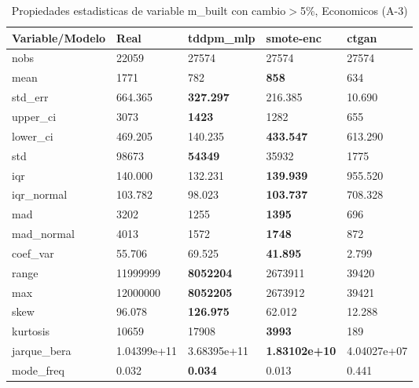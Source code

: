 \begin{table}[H]
\centering
\fontsize{8}{14}\selectfont
\caption{Propiedades estadisticas de variable m\_built con cambio\ensuremath{>}5\%, Economicos (A-3)}
\label{table-stats-economicos-a-3-m_built-short}
\begin{tabular}{|l|m{10em}|m{10em}|m{10em}|m{10em}|}
\hline
 \rowcolor[gray]{0.8}
Variable/Modelo & Real & tddpm\_mlp & smote-enc & ctgan \\
\hline nobs & 22059 & 27574 & 27574 & 27574 \\
\hline mean & 1771 & 782 & \bfseries 858 & \cellcolor[rgb]{0.9, 0.54, 0.52} 634 \\
\hline std\_err & 664.365 & \bfseries 327.297 & 216.385 & \cellcolor[rgb]{0.9, 0.54, 0.52} 10.690 \\
\hline upper\_ci & 3073 & \bfseries 1423 & 1282 & \cellcolor[rgb]{0.9, 0.54, 0.52} 655 \\
\hline lower\_ci & 469.205 & \cellcolor[rgb]{0.9, 0.54, 0.52} 140.235 & \bfseries 433.547 & 613.290 \\
\hline std & 98673 & \bfseries 54349 & 35932 & \cellcolor[rgb]{0.9, 0.54, 0.52} 1775 \\
\hline iqr & 140.000 & 132.231 & \bfseries 139.939 & \cellcolor[rgb]{0.9, 0.54, 0.52} 955.520 \\
\hline iqr\_normal & 103.782 & 98.023 & \bfseries 103.737 & \cellcolor[rgb]{0.9, 0.54, 0.52} 708.328 \\
\hline mad & 3202 & 1255 & \bfseries 1395 & \cellcolor[rgb]{0.9, 0.54, 0.52} 696 \\
\hline mad\_normal & 4013 & 1572 & \bfseries 1748 & \cellcolor[rgb]{0.9, 0.54, 0.52} 872 \\
\hline coef\_var & 55.706 & 69.525 & \bfseries 41.895 & \cellcolor[rgb]{0.9, 0.54, 0.52} 2.799 \\
\hline range & 11999999 & \bfseries 8052204 & 2673911 & \cellcolor[rgb]{0.9, 0.54, 0.52} 39420 \\
\hline max & 12000000 & \bfseries 8052205 & 2673912 & \cellcolor[rgb]{0.9, 0.54, 0.52} 39421 \\
\hline skew & 96.078 & \bfseries 126.975 & 62.012 & \cellcolor[rgb]{0.9, 0.54, 0.52} 12.288 \\
\hline kurtosis & 10659 & 17908 & \bfseries 3993 & \cellcolor[rgb]{0.9, 0.54, 0.52} 189 \\
\hline jarque\_bera & 1.04399e+11 & \cellcolor[rgb]{0.9, 0.54, 0.52} 3.68395e+11 & \bfseries 1.83102e+10 & 4.04027e+07 \\
\hline mode\_freq & 0.032 & \bfseries 0.034 & 0.013 & \cellcolor[rgb]{0.9, 0.54, 0.52} 0.441 \\

\end{tabular}
\end{table}
